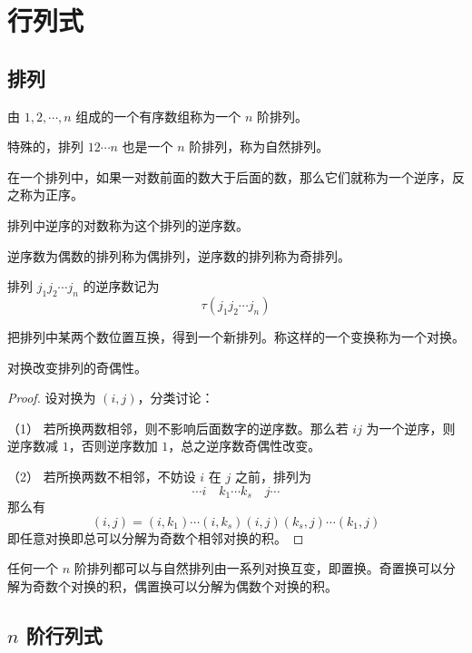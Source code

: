 
\chapter{行列式}

\section{排列}

\begin{definition}
	由 $1,2,\cdots,n$ 组成的一个有序数组称为一个 $n$ 阶排列。
\end{definition}

特殊的，排列 $12\cdots n$ 也是一个 $n$ 阶排列，称为自然排列。

\begin{definition}
	在一个排列中，如果一对数前面的数大于后面的数，那么它们就称为一个逆序，反之称为正序。
	
	排列中逆序的对数称为这个排列的逆序数。
\end{definition}

逆序数为偶数的排列称为偶排列，逆序数的排列称为奇排列。

排列 $j_1j_2\cdots j_n$ 的逆序数记为
\[\tau(j_1j_2\cdots j_n)\]

\begin{definition}
	把排列中某两个数位置互换，得到一个新排列。称这样的一个变换称为一个对换。
\end{definition}

\begin{theorem}
	对换改变排列的奇偶性。
\end{theorem}

\begin{proof}
	设对换为 $(i,j)$，分类讨论：

	（1） 若所换两数相邻，则不影响后面数字的逆序数。那么若 $ij$ 为一个逆序，则逆序数减 $1$，否则逆序数加 $1$，总之逆序数奇偶性改变。

	（2） 若所换两数不相邻，不妨设 $i$ 在 $j$ 之前，排列为
	\[\cdots i \quad k_1 \cdots k_s \quad j\cdots\]
	那么有
	\[(i,j)=(i,k_1)\cdots(i,k_s)(i,j)(k_s,j)\cdots(k_1,j)\]
	即任意对换即总可以分解为奇数个相邻对换的积。
\end{proof}

任何一个 $n$ 阶排列都可以与自然排列由一系列对换互变，即置换。奇置换可以分解为奇数个对换的积，偶置换可以分解为偶数个对换的积。

\section{\texorpdfstring{$n$ 阶行列式}{n 阶行列式}}

